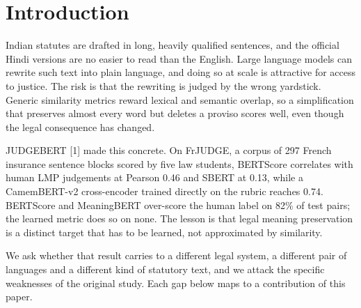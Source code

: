 \documentclass[conference]{IEEEtran}
\begin{document}
\section{Introduction}

Indian statutes are drafted in long, heavily qualified sentences, and the official Hindi versions are no easier to read than the English. Large language models can rewrite such text into plain language, and doing so at scale is attractive for access to justice. The risk is that the rewriting is judged by the wrong yardstick. Generic similarity metrics reward lexical and semantic overlap, so a simplification that preserves almost every word but deletes a proviso scores well, even though the legal consequence has changed.

JUDGEBERT [1] made this concrete. On FrJUDGE, a corpus of 297 French insurance sentence blocks scored by five law students, BERTScore correlates with human LMP judgements at Pearson 0.46 and SBERT at 0.13, while a CamemBERT-v2 cross-encoder trained directly on the rubric reaches 0.74. BERTScore and MeaningBERT over-score the human label on 82\% of test pairs; the learned metric does so on none. The lesson is that legal meaning preservation is a distinct target that has to be learned, not approximated by similarity.

We ask whether that result carries to a different legal system, a different pair of languages and a different kind of statutory text, and we attack the specific weaknesses of the original study. Each gap below maps to a contribution of this paper.
\end{document}
